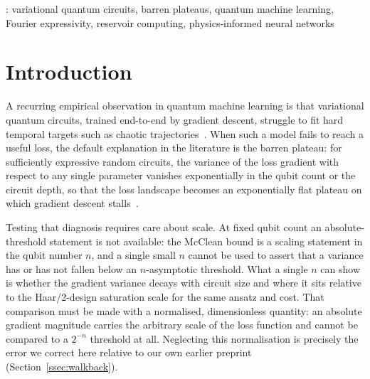 \documentclass[a4paper,12pt]{iopart}
\begin{document}
: variational quantum circuits, barren plateaus,
quantum machine learning, Fourier expressivity, reservoir computing,
physics-informed neural networks
\vspace{2pc}


\section{Introduction}

A recurring empirical observation in quantum machine learning is that
variational quantum circuits, trained end-to-end by gradient descent, struggle
to fit hard temporal targets such as chaotic
trajectories~\cite{mcclean2018,cerezo2021,pandey2604}. When such a model fails
to reach a useful loss, the default explanation in the literature is the barren
plateau: for sufficiently expressive random circuits, the variance of the loss
gradient with respect to any single parameter vanishes exponentially in the
qubit count or the circuit depth, so that the loss landscape becomes an
exponentially flat plateau on which gradient descent stalls~\cite{mcclean2018,
cerezo2021}.

Testing that diagnosis requires care about scale. At fixed qubit count an
absolute-threshold statement is not available: the McClean bound is a scaling
statement in the qubit number $n$, and a single small $n$ cannot be used to
assert that a variance has or has not fallen below an $n$-asymptotic threshold.
What a single $n$ can show is whether the gradient variance decays with circuit
size and where it sits relative to the Haar/2-design saturation scale for the
same ansatz and cost. That comparison must be made with a normalised,
dimensionless quantity: an absolute gradient magnitude carries the arbitrary
scale of the loss function and cannot be compared to a $2^{-n}$ threshold at
all. Neglecting this normalisation is precisely the error we correct here
relative to our own earlier preprint (Section~\ref{ssec:walkback}).
\end{document}
